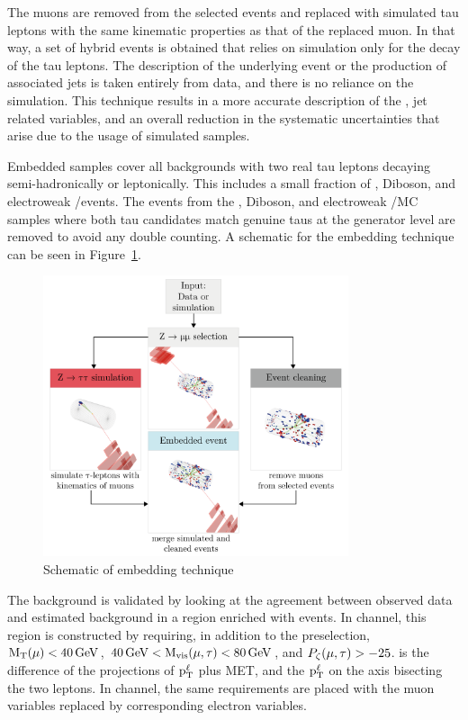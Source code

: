 The muons are removed from the selected events and replaced with simulated tau leptons with the same kinematic properties as that of the replaced muon. In that way, a set of hybrid events is obtained that relies on simulation only for the decay of the tau leptons. The description of the underlying event or the production of associated jets is taken entirely from data, and there is no reliance on the simulation. This technique results in a more accurate description of the \ptvecmiss, jet related variables, and an overall reduction in the systematic uncertainties that arise due to the usage of simulated samples.

Embedded samples cover all backgrounds with two real tau leptons decaying semi-hadronically or leptonically. This includes a small fraction of \ttbar, Diboson, and electroweak \PW/\PZ events. The events from the \ttbar, Diboson, and electroweak \PW/\PZ MC samples where both tau candidates match genuine taus at the generator level are removed to avoid any double counting. A schematic for the embedding technique can be seen in Figure~\ref{fig:embedding}.

\begin{figure}[htbp!]
  \centering
  \includegraphics[width=0.8\textwidth]{plots/chapter7/emb.png}
  \caption{Schematic of embedding technique}
  \label{fig:embedding}
\end{figure}

The \Ztt background is validated by looking at the agreement between observed data and estimated background in a region enriched with \Ztt events. In \muhad channel, this region is constructed by requiring, in addition to the preselection, $\text{M}_\mathrm{T}(\mu) < 40 \,\text{Ge\hspace{-.08em}V}$, $40 \,\text{Ge\hspace{-.08em}V} < \text{M}_{\text{vis}}(\mu, \tau) < 80 \,\text{Ge\hspace{-.08em}V}$, and $P_{\zeta}(\mu, \tau) > -25$. \pzeta is the difference of the projections of $\text{p}_\text{T}^{\ell}$ plus MET, and the $\text{p}_\text{T}^{\ell}$ on the axis bisecting the two leptons. In \ehad channel, the same requirements are placed with the muon variables replaced by corresponding electron variables.

